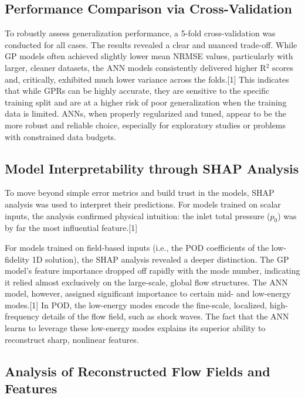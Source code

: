 \documentclass[12pt, a4paper]{report}
\begin{document}
\subsection{Performance Comparison via Cross-Validation}

To robustly assess generalization performance, a 5-fold cross-validation was conducted for all cases. The results revealed a clear and nuanced trade-off. While GP models often achieved slightly lower mean NRMSE values, particularly with larger, cleaner datasets, the ANN models consistently delivered higher R$^2$ scores and, critically, exhibited much lower variance across the folds.[1] This indicates that while GPRs can be highly accurate, they are sensitive to the specific training split and are at a higher risk of poor generalization when the training data is limited. ANNs, when properly regularized and tuned, appear to be the more robust and reliable choice, especially for exploratory studies or problems with constrained data budgets.

\subsection{Model Interpretability through SHAP Analysis}

To move beyond simple error metrics and build trust in the models, SHAP analysis was used to interpret their predictions. For models trained on scalar inputs, the analysis confirmed physical intuition: the inlet total pressure ($p_0$) was by far the most influential feature.[1]

For models trained on field-based inputs (i.e., the POD coefficients of the low-fidelity 1D solution), the SHAP analysis revealed a deeper distinction. The GP model's feature importance dropped off rapidly with the mode number, indicating it relied almost exclusively on the large-scale, global flow structures. The ANN model, however, assigned significant importance to certain mid- and low-energy modes.[1] In POD, the low-energy modes encode the fine-scale, localized, high-frequency details of the flow field, such as shock waves. The fact that the ANN learns to leverage these low-energy modes explains its superior ability to reconstruct sharp, nonlinear features.

\subsection{Analysis of Reconstructed Flow Fields and Features}
\end{document}
